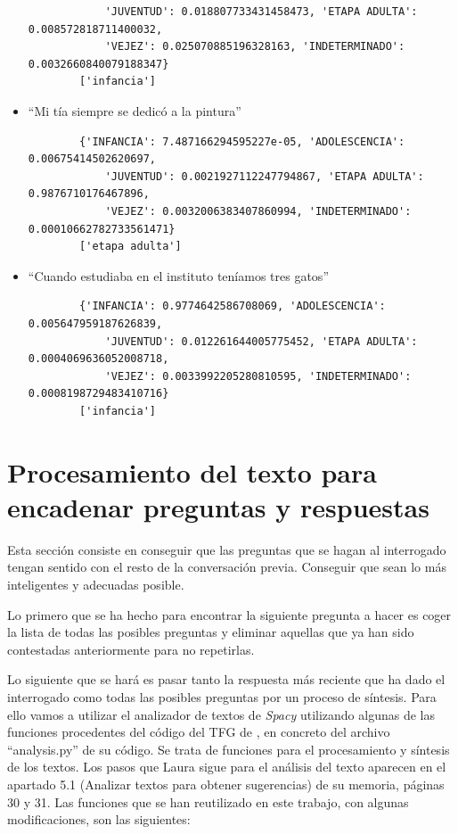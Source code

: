 \begin{itemize}
\begin{verbatim}
			'JUVENTUD': 0.018807733431458473, 'ETAPA ADULTA': 0.008572818711400032, 
			'VEJEZ': 0.025070885196328163, 'INDETERMINADO': 0.0032660840079188347}
		['infancia']
	\end{verbatim}
	\item ``Mi tía siempre se dedicó a la pintura''
	\begin{verbatim}
		{'INFANCIA': 7.487166294595227e-05, 'ADOLESCENCIA': 0.00675414502620697, 
			'JUVENTUD': 0.0021927112247794867, 'ETAPA ADULTA': 0.9876710176467896, 
			'VEJEZ': 0.0032006383407860994, 'INDETERMINADO': 0.00010662782733561471}
		['etapa adulta']
	\end{verbatim}
	\item ``Cuando estudiaba en el instituto teníamos tres gatos''
	\begin{verbatim}
		{'INFANCIA': 0.9774642586708069, 'ADOLESCENCIA': 0.005647959187626839, 
			'JUVENTUD': 0.012261644005775452, 'ETAPA ADULTA': 0.0004069636052008718, 
			'VEJEZ': 0.0033992205280810595, 'INDETERMINADO': 0.0008198729483410716}
		['infancia']
	\end{verbatim}
	
\end{itemize}



\section{Procesamiento del texto para encadenar preguntas y respuestas} \label{procesamiento}
 
Esta sección consiste en conseguir que las preguntas que se hagan al interrogado tengan sentido con el resto de la conversación previa. Conseguir que sean lo más inteligentes y adecuadas posible. 

Lo primero que se ha hecho para encontrar la siguiente pregunta a hacer es coger la lista de todas las posibles preguntas y eliminar aquellas que ya han sido contestadas anteriormente para no repetirlas. 

Lo siguiente que se hará es pasar tanto la respuesta más reciente que ha dado el interrogado como todas las posibles preguntas por un proceso de síntesis. Para ello vamos a utilizar el analizador de textos de \textit{Spacy} utilizando algunas de las funciones procedentes del código del TFG de \cite{lcastilla}, en concreto del archivo ``analysis.py'' de su código. Se trata de funciones para el procesamiento y síntesis de los textos. Los pasos que Laura sigue para el análisis del texto aparecen en el apartado 5.1 (Analizar textos para obtener sugerencias) de su memoria, páginas 30 y 31. Las funciones que se han reutilizado en este trabajo, con algunas modificaciones, son las siguientes:

